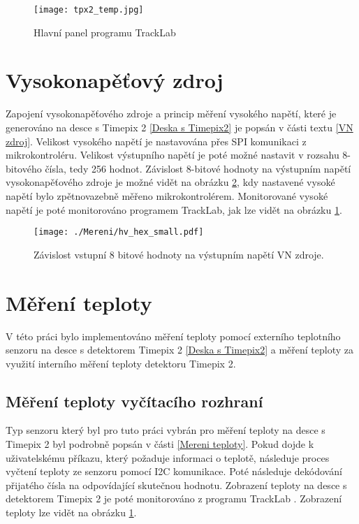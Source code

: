\begin{figure}[h!]
	\centering
	\captionsetup{justification=centering}
	\texttt{[image: tpx2\_temp.jpg]}
	\caption{Hlavní panel programu TrackLab \cite{Manek_2024}} 
	\label{fig:Tracklab}
\end{figure}



\section{Vysokonapěťový zdroj}
Zapojení vysokonapěťového zdroje a princip měření vysokého napětí, které je generováno na desce s Timepix 2 \ref{Deska s Timepix2} je popsán v části textu \ref{VN zdroj}. Velikost vysokého napětí je nastavována přes SPI komunikaci z mikrokontroléru. Velikost výstupního napětí je poté možné nastavit v rozsahu 8-bitového čísla, tedy 256 hodnot. Závislost 8-bitové hodnoty na výstupním napětí vysokonapěťového zdroje je možné vidět na obrázku \ref{fig:hv_hex}, kdy nastavené vysoké napětí bylo zpětnovazebně měřeno mikrokontrolérem. Monitorované vysoké napětí je poté monitorováno programem TrackLab, jak lze vidět na obrázku \ref{fig:Tracklab}.
\begin{figure}[h!]
	\centering
	\captionsetup{justification=centering}
	\texttt{[image: ./Mereni/hv\_hex\_small.pdf]}
	\caption{Závislost vstupní 8 bitové hodnoty na výstupním napětí VN zdroje.} 
	\label{fig:hv_hex}
\end{figure}

\section{Měření teploty}
V této práci bylo implementováno měření teploty pomocí externího teplotního senzoru na desce s detektorem Timepix 2 \ref{Deska s Timepix2} a měření teploty za využití interního měření teploty detektoru Timepix 2.
\subsection{Měření teploty vyčítacího rozhraní}
Typ senzoru který byl pro tuto práci vybrán pro měření teploty na desce s Timepix 2 byl podrobně popsán v části \ref{Mereni teploty}. Pokud dojde k uživatelskému příkazu, který požaduje informaci o teplotě, následuje proces vyčtení teploty ze senzoru pomocí I2C komunikace. Poté následuje dekódování přijatého čísla na odpovídající skutečnou hodnotu. Zobrazení teploty na desce s detektorem Timepix 2 je poté monitorováno z programu TrackLab \cite{Manek_2024}. Zobrazení teploty lze vidět na obrázku \ref{fig:Tracklab}.
